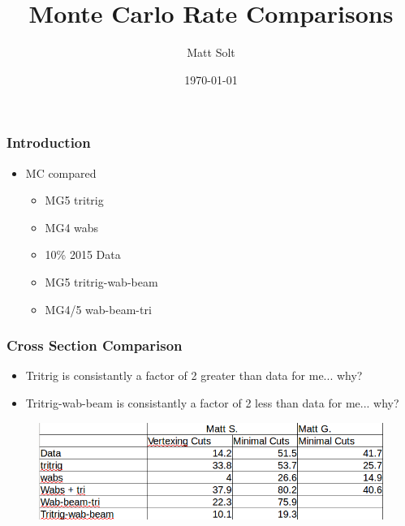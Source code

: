 \documentclass{beamer}
\title[MC Rates]{Monte Carlo Rate Comparisons} %
\author{Matt Solt} %
\institute[Stanford] %
{
SLAC National Accelerator Laboratory \\ %
\medskip
\textit{mrsolt@slac.stanford.edu} %
}
\date{\today} %
\begin{document}
\begin{frame}
\titlepage %
\end{frame}




\begin{frame}
\frametitle{Introduction}
\begin{itemize}
\item MC compared
\begin{itemize}
\item MG5 tritrig
\item MG4 wabs
\item 10\% 2015 Data
\item MG5 tritrig-wab-beam
\item MG4/5 wab-beam-tri
\end{itemize}
\end{itemize}

\end{frame}


\begin{frame}
\frametitle{Cross Section Comparison}
\begin{itemize}
\item Tritrig is consistantly a factor of 2 greater than data for me... why?
\item Tritrig-wab-beam is consistantly a factor of 2 less than data for me... why?
\end{itemize}
\begin{figure}
\includegraphics[width=1.0\linewidth]{figs/table2.png}
\end{figure}

\end{frame}
\end{document}
